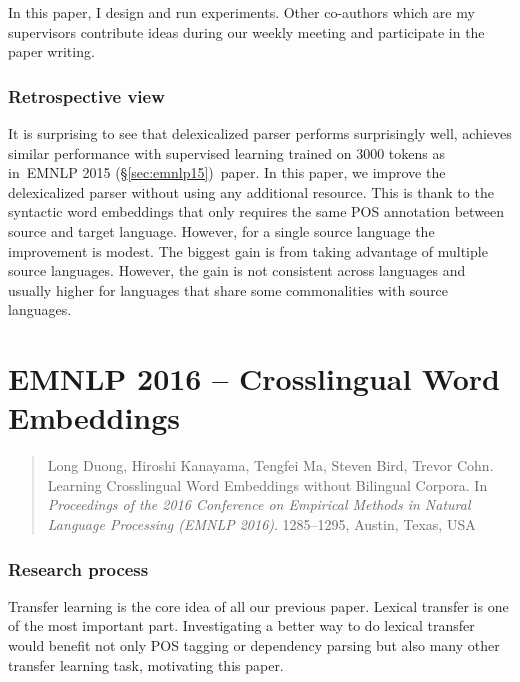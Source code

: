 \documentclass[12pt,twoside,final,hidelinks]{ltthesis}
\theoremstyle{definition}
\newcommand\emnlpv{EMNLP 2015 (\S\ref{sec:emnlp15})}
\begin{document}
In this paper, I design and run experiments. Other co-authors which are my supervisors contribute ideas during our weekly 
meeting and participate in the paper writing. 

\subsubsection{Retrospective view}
It is surprising to see that delexicalized parser performs surprisingly well, achieves similar performance with supervised learning 
trained on 3000 tokens as in~\emnlpv\ paper. In this paper, we improve the delexicalized parser without using any additional resource. This 
is thank to the syntactic word embeddings that only requires the same POS annotation between source and target 
language. However, for a single source language the improvement is modest. The biggest 
gain is from taking advantage of multiple source languages. However, the gain is not consistent across languages and usually higher for languages that share 
some commonalities with source languages. 






\section{EMNLP 2016 -- Crosslingual Word Embeddings}
\label{sec:emnlp16}
\begin{quote}
Long Duong, Hiroshi Kanayama, Tengfei Ma, Steven Bird, Trevor Cohn. Learning Crosslingual Word Embeddings without Bilingual Corpora. In \textit{Proceedings of the 2016 Conference on Empirical Methods in Natural Language Processing (EMNLP 2016)}. 1285--1295, Austin, Texas, USA\
\end{quote}

\subsubsection{Research process}
Transfer learning is the core idea of all our previous paper. Lexical transfer is one of the most important part. Investigating a better way to 
do lexical transfer would benefit not only POS tagging or dependency parsing but also many other transfer learning task, motivating this paper. 
\end{document}
